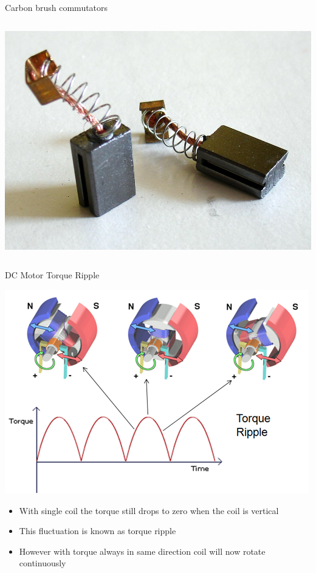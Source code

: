 \documentclass[compress]{beamer}
\begin{document}
\begin{frame}{Carbon brush commutators}
\begin{columns}
\begin{column}{0.4\linewidth}
\begin{center}
                \vspace{2em}
                \includegraphics[width=0.8\linewidth]{image23}
            \end{center}
        \end{column}
    \end{columns}


\end{frame}

\begin{frame}{DC Motor Torque Ripple}

    \begin{center}
        \includegraphics[height=0.4\paperheight]{image24}\hspace{1em}
    \end{center}

\begin{itemize}
\item With single coil the torque still drops to zero when the coil is
  vertical
\item This fluctuation is known as torque ripple
\item However with torque always in same direction coil will now rotate
  continuously
\end{itemize}

\end{frame}
\end{document}
